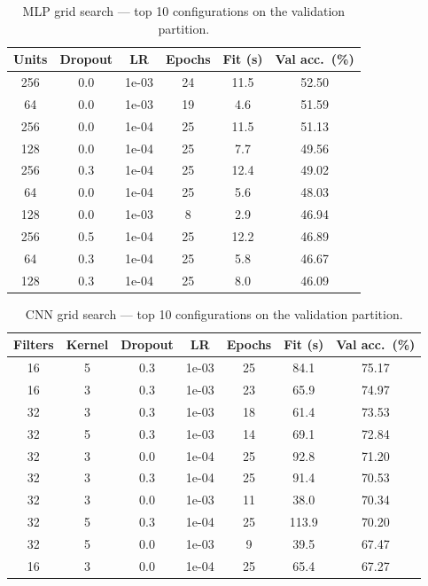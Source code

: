 \documentclass[../main.tex]{subfiles}
\begin{document}
\begin{table}[H]
    \centering
    \caption{MLP grid search — top 10 configurations on the validation
    partition.}
    \label{tab.mlp-tune}
    \begin{tabular}{cccccc}
        \toprule
        \textbf{Units} & \textbf{Dropout} & \textbf{LR} &
        \textbf{Epochs} & \textbf{Fit (s)} &
        \textbf{Val acc.\ (\%)} \\
        \midrule
        256 & 0.0 & 1e-03 & 24 & 11.5 & 52.50 \\
        64 & 0.0 & 1e-03 & 19 & 4.6 & 51.59 \\
        256 & 0.0 & 1e-04 & 25 & 11.5 & 51.13 \\
        128 & 0.0 & 1e-04 & 25 & 7.7 & 49.56 \\
        256 & 0.3 & 1e-04 & 25 & 12.4 & 49.02 \\
        64 & 0.0 & 1e-04 & 25 & 5.6 & 48.03 \\
        128 & 0.0 & 1e-03 & 8 & 2.9 & 46.94 \\
        256 & 0.5 & 1e-04 & 25 & 12.2 & 46.89 \\
        64 & 0.3 & 1e-04 & 25 & 5.8 & 46.67 \\
        128 & 0.3 & 1e-04 & 25 & 8.0 & 46.09 \\
        \bottomrule
    \end{tabular}
\end{table}

\begin{table}[H]
    \centering
    \caption{CNN grid search — top 10 configurations on the validation
    partition.}
    \label{tab.cnn-tune}
    \begin{tabular}{ccccccc}
        \toprule
        \textbf{Filters} & \textbf{Kernel} & \textbf{Dropout} &
        \textbf{LR} & \textbf{Epochs} & \textbf{Fit (s)} &
        \textbf{Val acc.\ (\%)} \\
        \midrule
        16 & 5 & 0.3 & 1e-03 & 25 & 84.1 & 75.17 \\
        16 & 3 & 0.3 & 1e-03 & 23 & 65.9 & 74.97 \\
        32 & 3 & 0.3 & 1e-03 & 18 & 61.4 & 73.53 \\
        32 & 5 & 0.3 & 1e-03 & 14 & 69.1 & 72.84 \\
        32 & 3 & 0.0 & 1e-04 & 25 & 92.8 & 71.20 \\
        32 & 3 & 0.3 & 1e-04 & 25 & 91.4 & 70.53 \\
        32 & 3 & 0.0 & 1e-03 & 11 & 38.0 & 70.34 \\
        32 & 5 & 0.3 & 1e-04 & 25 & 113.9 & 70.20 \\
        32 & 5 & 0.0 & 1e-03 & 9 & 39.5 & 67.47 \\
        16 & 3 & 0.0 & 1e-04 & 25 & 65.4 & 67.27 \\
        \bottomrule
    \end{tabular}
\end{table}
\end{document}
